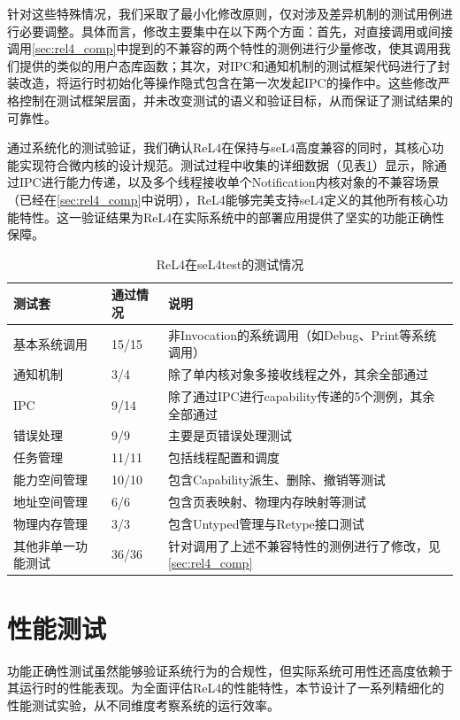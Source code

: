 针对这些特殊情况，我们采取了最小化修改原则，仅对涉及差异机制的测试用例进行必要调整。具体而言，修改主要集中在以下两个方面：首先，对直接调用或间接调用\ref{sec:rel4_comp}中提到的不兼容的两个特性的测例进行少量修改，使其调用我们提供的类似的用户态库函数；其次，对IPC和通知机制的测试框架代码进行了封装改造，将运行时初始化等操作隐式包含在第一次发起IPC的操作中。这些修改严格控制在测试框架层面，并未改变测试的语义和验证目标，从而保证了测试结果的可靠性。

通过系统化的测试验证，我们确认ReL4在保持与seL4高度兼容的同时，其核心功能实现符合微内核的设计规范。测试过程中收集的详细数据（见表\ref{tab:seL4_test_info}）显示，除通过IPC进行能力传递，以及多个线程接收单个Notification内核对象的不兼容场景（已经在\ref{sec:rel4_comp}中说明），ReL4能够完美支持seL4定义的其他所有核心功能特性。这一验证结果为ReL4在实际系统中的部署应用提供了坚实的功能正确性保障。


\begin{table}[htbp]
    \centering
    \begin{tabular*}{1.0\textwidth}{@{\extracolsep{\fill}}lll}
    \toprule
    测试套			&通过情况 &说明	 \\
    \midrule
    基本系统调用			&15/15 & 非Invocation的系统调用（如Debug、Print等系统调用） \\
      通知机制			&3/4 & 除了单内核对象多接收线程之外，其余全部通过	 \\
      IPC &9/14 & 除了通过IPC进行capability传递的5个测例，其余全部通过	 \\
      错误处理  &9/9 & 主要是页错误处理测试\\
      任务管理	&11/11 & 包括线程配置和调度 \\
      能力空间管理 &10/10 & 包含Capability派生、删除、撤销等测试\\
      地址空间管理 &6/6 & 包含页表映射、物理内存映射等测试 \\
      物理内存管理 &3/3 & 包含Untyped管理与Retype接口测试  \\
      其他非单一功能测试 & 36/36 & 针对调用了上述不兼容特性的测例进行了修改，见\ref{sec:rel4_comp} \\
    \bottomrule
    \end{tabular*}
    \caption{ReL4在seL4test的测试情况} \label{tab:seL4_test_info}
  \end{table}

\section{性能测试}
功能正确性测试虽然能够验证系统行为的合规性，但实际系统可用性还高度依赖于其运行时的性能表现。为全面评估ReL4的性能特性，本节设计了一系列精细化的性能测试实验，从不同维度考察系统的运行效率。

